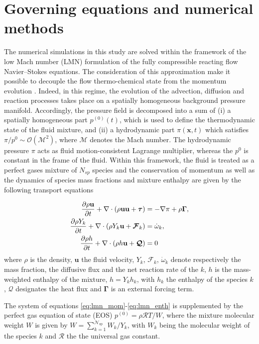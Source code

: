 \section{Governing equations and numerical methods}

The numerical simulations in this study are solved within the framework of the low Mach number (LMN) formulation of the fully compressible reacting flow Navier--Stokes equations. 
%
The consideration of this approximation make it possible to decouple the flow thermo-chemical state
from the momentum evolution \cite{paolucci1982filtering}. 
%
Indeed, in this regime, the evolution of the advection, diffusion and reaction processes takes
place on a spatially homogeneous background pressure manifold.
%
Accordingly, the pressure field is decomposed into a sum of (i) a spatially homogeneous part $p^{(0)}(t)$, which is used to define the thermodynamic state of the fluid mixture, and (ii) a hydrodynamic part 
$\pi(\mathbf{x}, t)$ which satisfies $\pi/p^{0} \sim \mathcal{O}(\mathcal{M}^2)$, where $\mathcal{M}$
denotes the Mach number.
%
The hydrodynamic pressure $\pi$ acts as fluid motion-consistent Lagrange multiplier, whereas the
 $p^0$ is constant in the frame of the fluid.
%
Within this framework, the fluid is treated as a perfect gases mixture of $N_{sp}$ species
and the conservation of momentum as well as the dynamics of species mass fractions 
and mixture enthalpy are given by the following transport equations

\begin{align}
\frac{\partial\rho \mathbf{u}}{\partial t} + \nabla \cdot (\rho \mathbf{u} \mathbf{u} + \boldsymbol{\tau})
&= -\nabla \pi  + \rho \boldsymbol{\Gamma},
\label{eq:lmn_mom}\\
\frac{\partial\rho  Y_k}{\partial t} +  \nabla \cdot  (\rho  Y_k \mathbf{u} + \boldsymbol{\mathcal{F}}_k)
&=  \dot{\omega}_k ,
\label{eq:lmn_spec}\\
\frac{\partial\rho h}{\partial t} + \nabla \cdot  (\rho h \mathbf{u} + \boldsymbol{\mathcal{Q}}) 
&= 0
\label{eq:lmn_enth}
\end{align}
%
where $\rho$ is the density, $\mathbf{u}$ the fluid velocity, $Y_k$, $\boldsymbol{\mathcal{F}}_k$,
 $\dot{\omega}_k$ denote respectively the mass fraction, the diffusive flux and the net reaction 
 rate of the $k$\th,  $h$ is the mass-weighted enthalpy of the mixture, 
 \ie $h=Y_k h_k$, with $h_k$ the enthalpy of the species $k$, $\boldsymbol{\mathcal{Q}}$ designates 
 the heat flux and $\boldsymbol{\Gamma}$ is an external forcing term.

The system of equations \eqref{eq:lmn_mom}-\eqref{eq:lmn_enth} is supplemented by the perfect 
gas equation of state (EOS) $p^{(0)}=\rho \mathcal{R} T / W$, where the mixture molecular weight
 $W$ is given by $W= \sum_{k=1}^{\mathcal{N}_{\mathrm{sp}}} W_k/Y_{k}$, with $W_{k}$ being 
the molecular weight of the species $k$ and $\mathcal{R}$ the the universal gas constant.


